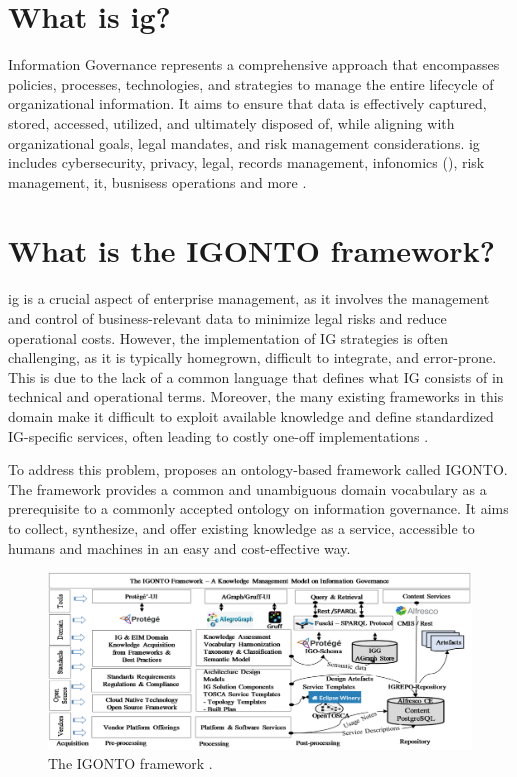 \documentclass[
  a4paper,  %
  twoside,  %
  bibliography=totoc,
  headsepline,
  cleardoublepage=empty,
  parskip=half,
  draft=false
]{scrbook}
\begin{document}
\section{What is \acrfull{ig}?}
Information Governance represents a comprehensive approach that encompasses policies, processes, technologies, and strategies to manage the entire lifecycle of organizational information. It aims to ensure that data is effectively captured, stored, accessed, utilized, and ultimately disposed of, while aligning with organizational goals, legal mandates, and risk management considerations. \acrshort{ig} includes cybersecurity, privacy, legal, records management, infonomics (), risk management, \acrfull{it}, busnisess operations and more \cite{IG}.

\section{What is the IGONTO framework?}
\acrfull{ig} is a crucial aspect of enterprise management, as it involves the management and control of business-relevant data to minimize legal risks and reduce operational costs. However, the implementation of IG strategies is often challenging, as it is typically homegrown, difficult to integrate, and error-prone. This is due to the lack of a common language that defines what IG consists of in technical and operational terms. Moreover, the many existing frameworks in this domain make it difficult to exploit available knowledge and define standardized IG-specific services, often leading to costly one-off implementations \cite{IGONTO}.

To address this problem, \cite{IGONTO} proposes an ontology-based framework called IGONTO. The framework provides a common and unambiguous domain vocabulary as a prerequisite to a commonly accepted ontology on information governance. It aims to collect, synthesize, and offer existing knowledge as a service, accessible to humans and machines in an easy and cost-effective way. 

\begin{figure}
  \centering
  \includegraphics[width=\textwidth]{graphics/igontoFramework.png}
  \caption{The IGONTO framework \cite{IGONTO}. }
  \label{fig:igontoFramework}
\end{figure}
\end{document}
